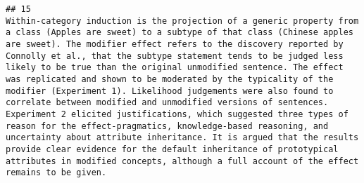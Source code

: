 \documentclass[
  english,
  man]{apa6}
\begin{document}
\begin{verbatim}
## 15                                                                                                                                                                                                                                                                                                                                                                                                                                                                                                                                                                                                                                                                                                                                                                                                                                                                                                                                                                                                                                                                                                                                                                                                                                                                                                                                                                                                                                                                                                                                                                                                                                                                                                                                 Within-category induction is the projection of a generic property from a class (Apples are sweet) to a subtype of that class (Chinese apples are sweet). The modifier effect refers to the discovery reported by Connolly et al., that the subtype statement tends to be judged less likely to be true than the original unmodified sentence. The effect was replicated and shown to be moderated by the typicality of the modifier (Experiment 1). Likelihood judgements were also found to correlate between modified and unmodified versions of sentences. Experiment 2 elicited justifications, which suggested three types of reason for the effect-pragmatics, knowledge-based reasoning, and uncertainty about attribute inheritance. It is argued that the results provide clear evidence for the default inheritance of prototypical attributes in modified concepts, although a full account of the effect remains to be given.

\end{verbatim}
\end{document}
